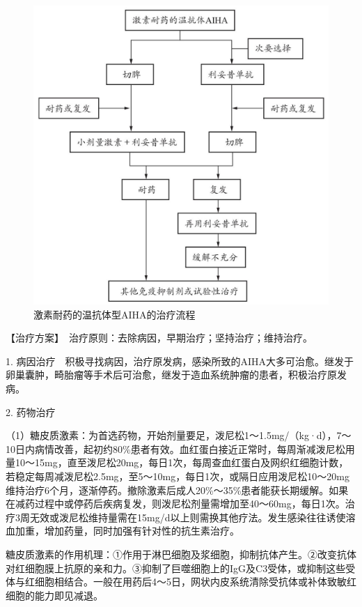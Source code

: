 \begin{figure}[!htbp]
 \centering
 \includegraphics{./images/Image00151.jpg}
 \captionsetup{justification=centering}
 \caption{激素耐药的温抗体型AIHA的治疗流程}
 \label{fig5-2-1}
  \end{figure} 

【治疗方案】　治疗原则：去除病因，早期治疗；坚持治疗；维持治疗。

1.
病因治疗　积极寻找病因，治疗原发病，感染所致的AIHA大多可治愈。继发于卵巢囊肿，畸胎瘤等手术后可治愈，继发于造血系统肿瘤的患者，积极治疗原发病。

2. 药物治疗

（1）糖皮质激素：为首选药物，开始剂量要足，泼尼松1～1.5mg/（kg·d），7～10日内病情改善，起初约80\%患者有效。血红蛋白接近正常时，每周渐减泼尼松用量10～15mg，直至泼尼松20mg，每日1次，每周查血红蛋白及网织红细胞计数，若稳定每周减泼尼松2.5mg，至5～10mg，每日1次，或隔日应用泼尼松10～20mg维持治疗6个月，逐渐停药。撤除激素后成人20\%～35\%患者能获长期缓解。如果在减药过程中或停药后疾病复发，则泼尼松剂量需增加至40～60mg，每日1次。治疗3周无效或泼尼松维持量需在15mg/d以上则需换其他疗法。发生感染往往诱使溶血加重，增加药量，同时加强有针对性的抗生素治疗。

糖皮质激素的作用机理：①作用于淋巴细胞及浆细胞，抑制抗体产生。②改变抗体对红细胞膜上抗原的亲和力。③抑制了巨噬细胞上的IgG及C3受体，或抑制这些受体与红细胞相结合。一般在用药后4～5日，网状内皮系统清除受抗体或补体致敏红细胞的能力即见减退。

